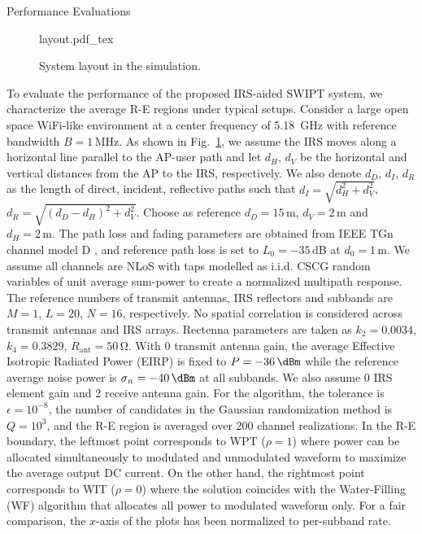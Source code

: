 \documentclass[journal]{IEEEtran}
\begin{document}
	\begin{section}{Performance Evaluations}\label{se:performance_evaluation}
		\begin{figure}[!t]
			\centering
			\def\svgwidth{\columnwidth}
			{layout.pdf_tex}
			\caption{System layout in the simulation.}
			\label{fi:layout}
		\end{figure}
		To evaluate the performance of the proposed IRS-aided SWIPT system, we characterize the average R-E regions under typical setups. Consider a large open space WiFi-like environment at a center frequency of \SI{5.18}{\GHz} with reference bandwidth $B=1\,\si{\MHz}$. As shown in Fig.~\ref{fi:layout}, we assume the IRS moves along a horizontal line parallel to the AP-user path and let $d_H$, $d_V$ be the horizontal and vertical distances from the AP to the IRS, respectively. We also denote $d_D$, $d_I$, $d_R$ as the length of direct, incident, reflective paths such that $d_I=\sqrt{d_H^2+d_V^2}$, $d_R=\sqrt{(d_D-d_H)^2+d_V^2}$. Choose as reference $d_D=15\,\si{\meter}$, $d_V=2\,\si{\meter}$ and $d_H=2\,\si{\meter}$. The path loss and fading parameters are obtained from IEEE TGn channel model D \cite{Erceg2004}, and reference path loss is set to $L_0=-35\,\si{\dB}$ at $d_0=1\,\si{\meter}$. We assume all channels are NLoS with taps modelled as i.i.d. CSCG random variables of unit average sum-power to create a normalized multipath response. The reference numbers of transmit antennas, IRS reflectors and subbands are $M=1$, $L=20$, $N=16$, respectively. No spatial correlation is considered across transmit antennas and IRS arrays. Rectenna parameters are taken as $k_2=0.0034$, $k_4=0.3829$, $R_{\text{ant}}=50\,\si{\ohm}$. With \SI{0}{\dBi} transmit antenna gain, the average Effective Isotropic Radiated Power (EIRP) is fixed to $P=-36\,\si{\dBm}$ while the reference average noise power is $\sigma_n=-40\,\si{\dBm}$ at all subbands. We also assume \SI{0}{\dBi} IRS element gain and \SI{2}{\dBi} receive antenna gain. For the algorithm, the tolerance is $\epsilon=10^{-8}$, the number of candidates in the Gaussian randomization method is $Q=10^{3}$, and the R-E region is averaged over \num{200} channel realizations. In the R-E boundary, the leftmost point corresponds to WPT ($\rho=1$) where power can be allocated simultaneously to modulated and unmodulated waveform to maximize the average output DC current. On the other hand, the rightmost point corresponds to WIT ($\rho=0$) where the solution coincides with the Water-Filling (WF) algorithm that allocates all power to modulated waveform only. For a fair comparison, the $x$-axis of the plots has been normalized to per-subband rate.


\end{section}
\end{document}
